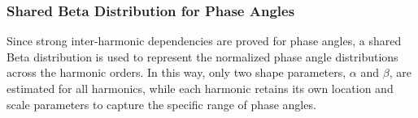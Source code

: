 



\subsubsection{Shared Beta Distribution for Phase Angles}
Since strong inter-harmonic dependencies are proved for phase angles, a shared Beta distribution is used to represent the normalized phase angle distributions across the harmonic orders. In this way, only two shape parameters, $\alpha$ and $\beta$, are estimated for all harmonics, while each harmonic retains its own location and scale parameters to capture the specific range of phase angles.

